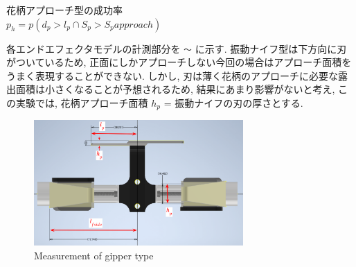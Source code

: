 花柄アプローチ型の成功率\\
\vspace{5mm}
$p_h = p(d_p > l_p \cap S_p > S_papproach)$

\vspace{10mm}
各エンドエフェクタモデルの計測部分を \verb|〜| に示す.
振動ナイフ型は下方向に刃がついているため, 正面にしかアプローチしない今回の場合はアプローチ面積をうまく表現することができない.
しかし, 刃は薄く花柄のアプローチに必要な露出面積は小さくなることが予想されるため, 結果にあまり影響がないと考え, この実験では, 花柄アプローチ面積 $h_p$ = 振動ナイフの刃の厚さとする. 

\vspace{5mm}
\begin{figure}[H]
  \centering
  \includegraphics[width=80mm]{images/png/finraycad.png}
  \caption{Measurement of gipper type}
  \label{Fig:finraycad}
\end{figure}

